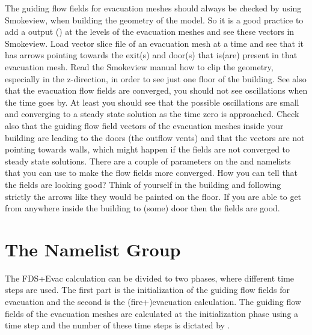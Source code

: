 \documentclass[12pt,a4paper,final,twoside]{stylevk}
\begin{document}
The guiding flow fields for evacuation meshes should always be checked
by using Smokeview, when building the geometry of the model.  So it is
a good practice to add a  output () at the levels of the
evacuation meshes and see these vectors in Smokeview.  Load vector
slice file of an evacuation mesh at a time and see that it has arrows
pointing towards the exit(s) and door(s) that is(are) present in that
evacuation mesh.  Read the Smokeview manual how to clip the
geometry, especially in the z-direction, in order to see just one
floor of the building.  See also that the evacuation flow fields are
converged, you should not see oscillations when the time goes by.  At
least you should see that the possible oscillations are small and
converging to a steady state solution as the time zero is approached.
Check also that the guiding flow field vectors of the evacuation
meshes inside your building are leading to the doors (the outflow
vents) and that the vectors are not pointing towards walls, which
might happen if the fields are not converged to steady state
solutions.  There are a couple of parameters on the  and
 namelists that you can use to make the flow fields more
converged.  How you can tell that the fields are looking good? Think
of yourself in the building and following strictly the arrows like
they would be painted on the floor.  If you are able to get from
anywhere inside the building to (some) door then the fields are good.



\section{The  Namelist Group}\label{Sec_TimeNML}

The FDS+Evac calculation can be divided to two phases, where different
time steps are used.  The first part is the initialization of the
guiding flow fields for evacuation and the second is the
(fire+)evacuation calculation.  The guiding flow fields of the
evacuation meshes are calculated at the initialization phase using a
time step  and the number of these time
steps is dictated by .
\end{document}
